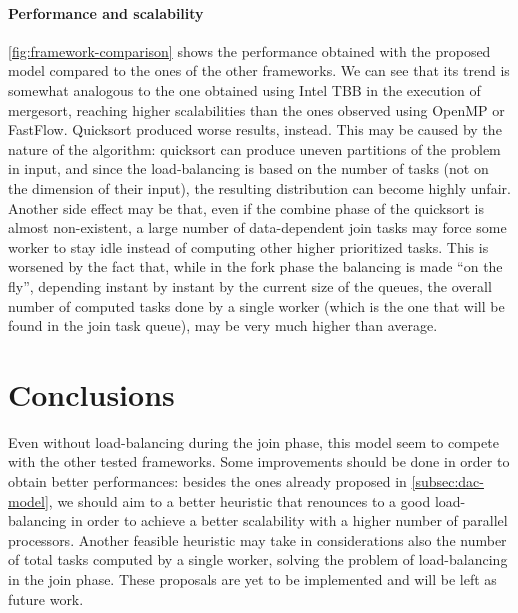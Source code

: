 \documentclass[11pt, a4paper]{article}
\begin{document}
\paragraph{Performance and scalability} \autoref{fig:framework-comparison} shows the performance obtained with the proposed model compared to the ones of the other frameworks. We can see that its trend is somewhat analogous to the one obtained using Intel TBB in the execution of mergesort, reaching higher scalabilities than the ones observed using OpenMP or FastFlow. Quicksort produced worse results, instead. This may be caused by the nature of the algorithm: quicksort can produce uneven partitions of the problem in input, and since the load-balancing is based on the number of tasks (not on the dimension of their input), the resulting distribution can become highly unfair. Another side effect may be that, even if the combine phase of the quicksort is almost non-existent, a large number of data-dependent join tasks may force some worker to stay idle instead of computing other higher prioritized tasks. This is worsened by the fact that, while in the fork phase the balancing is made ``on the fly'', depending instant by instant by the current size of the queues, the overall number of computed tasks done by a single worker (which is the one that will be found in the join task queue), may be very much higher than average. 


\section{Conclusions}\label{sec:conclusions}

Even without load-balancing during the join phase, this model seem to compete with the other tested frameworks. Some improvements should be done in order to obtain better performances: besides the ones already proposed in \autoref{subsec:dac-model}, we should aim to a better heuristic that renounces to a good load-balancing in order to achieve a better scalability with a higher number of parallel processors. Another feasible heuristic may take in considerations also the number of total tasks computed by a single worker, solving the problem of load-balancing in the join phase. These proposals are yet to be implemented and will be left as future work.


\printbibliography
\pagebreak
\end{document}
